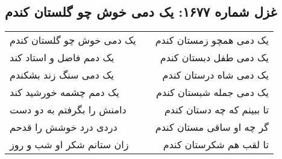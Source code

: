 \begin{center}
\section*{غزل شماره ۱۶۷۷: یک دمی خوش چو گلستان کندم}
\label{sec:1677}
\begin{longtable}{l p{0.5cm} r}
یک دمی خوش چو گلستان کندم
&&
یک دمی همچو زمستان کندم
\\
یک دمم فاضل و استاد کند
&&
یک دمی طفل دبستان کندم
\\
یک دمی سنگ زند بشکندم
&&
یک دمی شاه درستان کندم
\\
یک دمم چشمه خورشید کند
&&
یک دمی جمله شبستان کندم
\\
دامنش را بگرفتم به دو دست
&&
تا ببینم که چه دستان کندم
\\
دردی درد خوشش را قدحم
&&
گر چه او ساقی مستان کندم
\\
زان ستانم شکر او شب و روز
&&
تا لقب هم شکرستان کندم
\\
\end{longtable}
\end{center}
